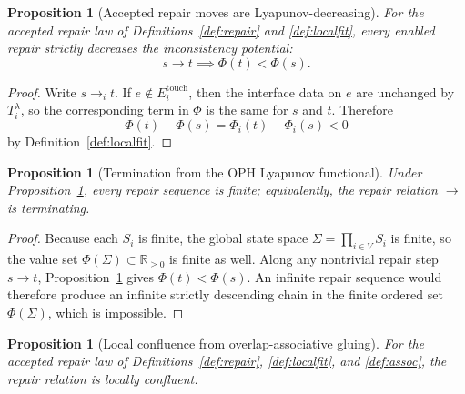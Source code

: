 \documentclass[11pt]{article}
\newtheorem{proposition}[theorem]{Proposition}
\theoremstyle{remark}
\theoremstyle{plain}
\begin{document}
\begin{proposition}[Accepted repair moves are Lyapunov-decreasing]\label{prop:lyapunov-descent}
For the accepted repair law of Definitions~\ref{def:repair} and \ref{def:localfit}, every enabled
repair strictly decreases the inconsistency potential:
\[
s\to t \implies \Phi(t)<\Phi(s).
\]
\end{proposition}

\begin{proof}
Write \(s\to_i t\). If \(e\notin E_i^{\mathrm{touch}}\), then the interface data on \(e\) are
unchanged by \(T_i^\lambda\), so the corresponding term in \(\Phi\) is the same for \(s\) and
\(t\). Therefore
\[
\Phi(t)-\Phi(s)=\Phi_i(t)-\Phi_i(s)<0
\]
by Definition~\ref{def:localfit}.
\end{proof}

\begin{proposition}[Termination from the OPH Lyapunov functional]\label{prop:lyapunov-termination}
Under Proposition~\ref{prop:lyapunov-descent}, every repair sequence is finite; equivalently, the
repair relation \(\to\) is terminating.
\end{proposition}

\begin{proof}
Because each \(S_i\) is finite, the global state space \(\Sigma=\prod_{i\in V}S_i\) is finite, so
the value set \(\Phi(\Sigma)\subset\mathbb{R}_{\ge 0}\) is finite as well. Along any nontrivial
repair step \(s\to t\), Proposition~\ref{prop:lyapunov-descent} gives \(\Phi(t)<\Phi(s)\). An infinite repair
sequence would therefore produce an infinite strictly descending chain in the finite ordered set
\(\Phi(\Sigma)\), which is impossible.
\end{proof}

\begin{proposition}[Local confluence from overlap-associative gluing]\label{prop:local-confluence}
For the accepted repair law of Definitions~\ref{def:repair}, \ref{def:localfit}, and
\ref{def:assoc}, the repair relation is locally confluent.
\end{proposition}
\end{document}

